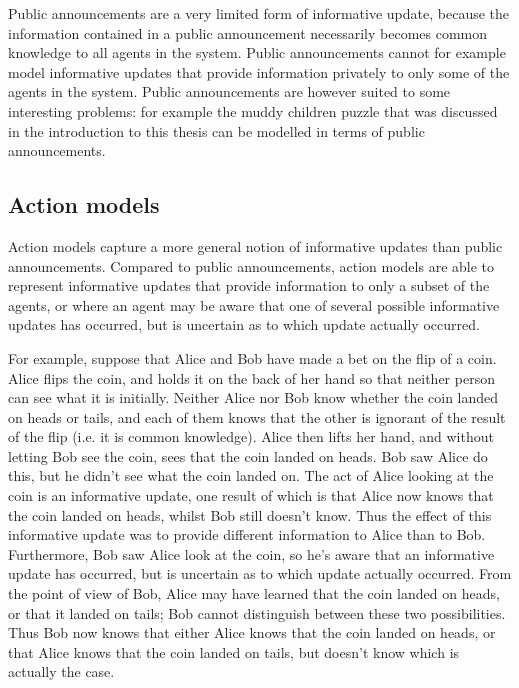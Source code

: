Public announcements are a very limited form of informative update, because the
information contained in a public announcement necessarily becomes common
knowledge to all agents in the system. Public announcements cannot for example
model informative updates that provide information privately to only some of
the agents in the system. Public announcements are however suited to some
interesting problems: for example the muddy children puzzle that was discussed
in the introduction to this thesis can be modelled in terms of public
announcements.

\subsection{Action models}\label{litreview-am}

Action models capture a more general notion of informative updates than public
announcements. Compared to public announcements, action models are able to
represent informative updates that provide information to only a subset of the
agents, or where an agent may be aware that one of several possible informative
updates has occurred, but is uncertain as to which update actually occurred. 

For example, suppose that Alice and Bob have made a bet on the flip of a coin.
Alice flips the coin, and holds it on the back of her hand so that neither
person can see what it is initially. Neither Alice nor Bob know whether the coin
landed on heads or tails, and each of them knows that the other is ignorant of
the result of the flip (i.e. it is common knowledge). Alice then lifts her hand,
and without letting Bob see the coin, sees that the coin landed on heads. Bob
saw Alice do this, but he didn't see what the coin landed on. The act of Alice
looking at the coin is an informative update, one result of which is that Alice
now knows that the coin landed on heads, whilst Bob still doesn't know. Thus the
effect of this informative update was to provide different information to Alice
than to Bob.  Furthermore, Bob saw Alice look at the coin, so he's aware that an
informative update has occurred, but is uncertain as to which update actually
occurred. From the point of view of Bob, Alice may have learned that the coin
landed on heads, or that it landed on tails; Bob cannot distinguish between
these two possibilities. Thus Bob now knows that either Alice knows that the
coin landed on heads, or that Alice knows that the coin landed on tails, but
doesn't know which is actually the case.

